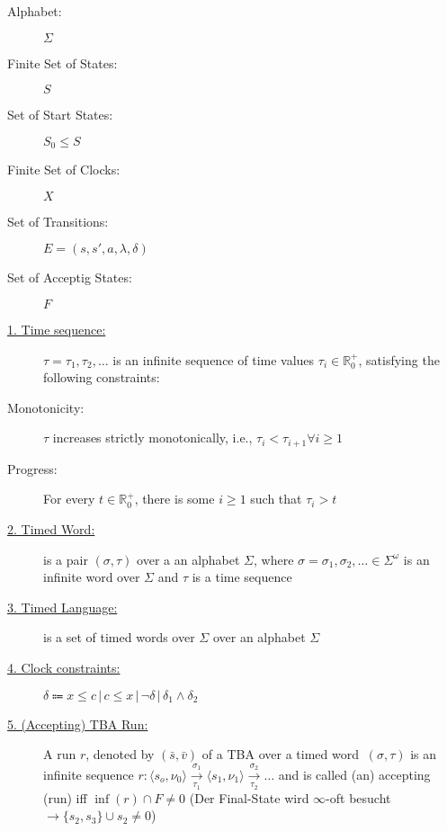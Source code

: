 \begin{tcolorbox}[colback=kapiteleins!5!white, colframe=orange!75!black, title=\textbf{Automatic Verification of DC Properties for Timed Automata}, left=0mm, right=0mm, top=0mm, bottom=0mm]

\end{tcolorbox}

\begin{tcolorbox}[colback=kapiteleins!5!white, colframe=orange!75!black, title=\textbf{Testability}, left=0mm, right=0mm, top=0mm, bottom=0mm]


\end{tcolorbox}

\begin{tcolorbox}[colback=kapiteleins!5!white, colframe=orange!75!black, title=\textbf{Timed Büchi Automata $\mathcal{A} = \left( \Sigma, S, S_0, X, E, F \right)$}, left=0mm, right=0mm, top=0mm, bottom=0mm]
\begin{description}
\item[Alphabet:] $\Sigma$
\item[Finite Set of States:] $S$
\item[Set of Start States:] $S_0 \leq S$
\item[Finite Set of Clocks:] $X$
\item[Set of Transitions:] $E = \left( s, s', a, \lambda, \delta \right)$
\item[Set of Acceptig States:] $F$
\item[\uline{1. Time sequence:}] $\tau = \tau_1, \tau_2, \ldots$ is an infinite sequence of time values $\tau_i \in\mathbb{R}_0^+$, satisfying the following constraints:
\item[Monotonicity:] $\tau$ increases strictly monotonically, i.e., $\tau_i < \tau_{i+1} \forall i \geq 1$
\item[Progress:] For every $t \in \mathbb{R}_0^+$, there is some $i \geq 1$ such that $\tau_i > t$
\item[\uline{2. Timed Word:}] is a pair $(\sigma, \tau)$ over a an alphabet $\Sigma$, where $\sigma = \sigma_1, \sigma_2, \ldots \in \Sigma^\omega$ is an infinite word over $\Sigma$ and $\tau$ is a time sequence
\item[\uline{3. Timed Language:}] is a set of timed words over $\Sigma$ over an alphabet $\Sigma$
\item[\uline{4. Clock constraints:}] $\delta \Coloneqq x \leq c \, \vert \, c \leq x \, \vert \, \lnot \delta \, \vert \, \delta_1 \land \delta_2$
\item[\uline{5. (Accepting) TBA Run:}] A run $r$, denoted by $\left( \bar{s}, \bar{v} \right)$ of a TBA over a timed word $\ \left( \sigma, \tau \right)$ is an infinite sequence $r: \langle s_o, \nu_0 \rangle \xrightarrow[\tau_1]{\sigma_1} \langle s_1, \nu_1 \rangle \xrightarrow[\tau_2]{\sigma_2} \ldots$ and is called (an) accepting (run) iff $\inf(r) \cap F \neq 0$ (Der Final-State wird $\infty$-oft besucht $\rightarrow \{s_2, s_3\} \cup {s_2} \neq 0$)

\end{description}
\end{tcolorbox}

